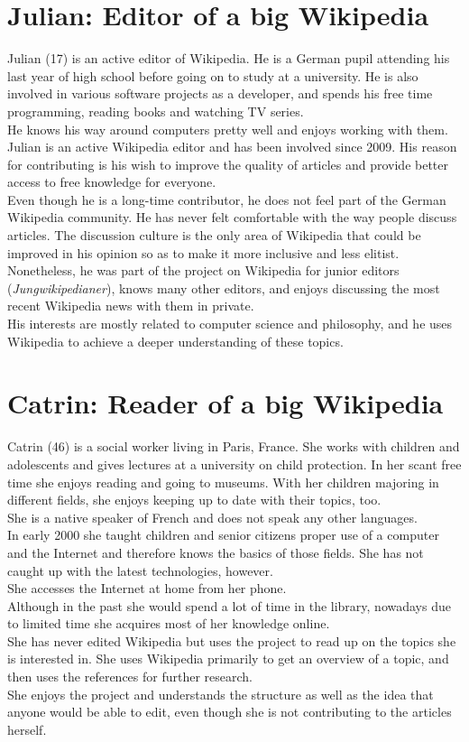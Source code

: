 \section{Julian: Editor of a big Wikipedia}
Julian (17) is an active editor of Wikipedia. He is a German pupil attending his last year of high school before going on to study at a university. He is also involved in various software projects as a developer, and spends his free time programming, reading books and watching TV series. \\
He knows his way around computers pretty well and enjoys working with them. \\
Julian is an active Wikipedia editor and has been involved since 2009. His reason for contributing is his wish to improve the quality of articles and provide better access to free knowledge for everyone. \\
Even though he is a long-time contributor, he does not feel part of the German Wikipedia community. He has never felt comfortable with the way people discuss articles. The discussion culture is the only area of Wikipedia that could be improved in his opinion so as to make it more inclusive and less elitist. \\
Nonetheless, he was part of the project on Wikipedia for junior editors (\textit{Jungwikipedianer}), knows many other editors, and enjoys discussing the most recent Wikipedia news with them in private. \\
His interests are mostly related to computer science and philosophy, and he uses Wikipedia to achieve a deeper understanding of these topics.

\section{Catrin: Reader of a big Wikipedia}
Catrin (46) is a social worker living in Paris, France. She works with children and adolescents and gives lectures at a university on child protection. In her scant free time she enjoys reading and going to museums. With her children majoring in different fields, she enjoys keeping up to date with their topics, too. \\
She is a native speaker of French and does not speak any other languages. \\
In early 2000 she taught children and senior citizens proper use of a computer and the Internet and therefore knows the basics of those fields. She has not caught up with the latest technologies, however. \\
She accesses the Internet at home from her phone. \\
Although in the past she would spend a lot of time in the library, nowadays due to limited time she acquires most of her knowledge online. \\
She has never edited Wikipedia but uses the project to read up on the topics she is interested in. She uses Wikipedia primarily to get an overview of a topic, and then uses the references for further research. \\
She enjoys the project and understands the structure as well as  the idea that anyone would be able to edit, even though she is not contributing to the articles herself.

